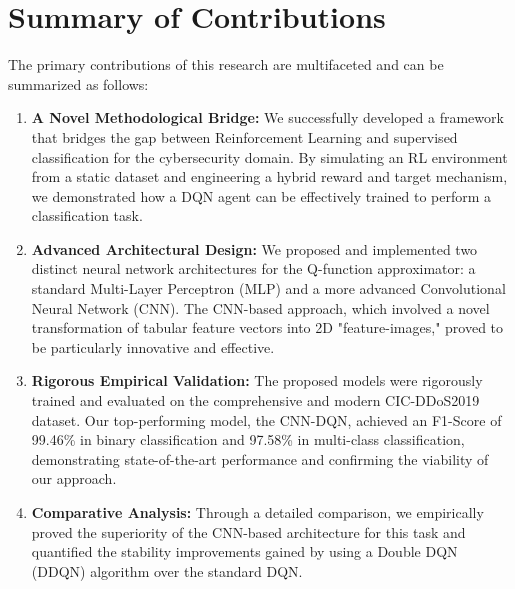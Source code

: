 \documentclass[12pt]{report}
\begin{document}
\section{Summary of Contributions}
The primary contributions of this research are multifaceted and can be summarized as follows:
\begin{enumerate}
    \item \textbf{A Novel Methodological Bridge:} We successfully developed a framework that bridges the gap between Reinforcement Learning and supervised classification for the cybersecurity domain. By simulating an RL environment from a static dataset and engineering a hybrid reward and target mechanism, we demonstrated how a DQN agent can be effectively trained to perform a classification task.
    \item \textbf{Advanced Architectural Design:} We proposed and implemented two distinct neural network architectures for the Q-function approximator: a standard Multi-Layer Perceptron (MLP) and a more advanced Convolutional Neural Network (CNN). The CNN-based approach, which involved a novel transformation of tabular feature vectors into 2D "feature-images," proved to be particularly innovative and effective.
    \item \textbf{Rigorous Empirical Validation:} The proposed models were rigorously trained and evaluated on the comprehensive and modern CIC-DDoS2019 dataset. Our top-performing model, the CNN-DQN, achieved an F1-Score of 99.46\% in binary classification and 97.58\% in multi-class classification, demonstrating state-of-the-art performance and confirming the viability of our approach.
    \item \textbf{Comparative Analysis:} Through a detailed comparison, we empirically proved the superiority of the CNN-based architecture for this task and quantified the stability improvements gained by using a Double DQN (DDQN) algorithm over the standard DQN.
\end{enumerate}
\end{document}
